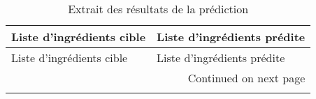 \begin{longtable}{p{7cm}p{7cm}}
\caption{Extrait des résultats de la prédiction}\label{tbl:GT_prediction_sample}\\ \hline
\toprule
                                                                                                                                                                                                                                                                              Liste d'ingrédients cible &                                                                                                                                                                                                                                                                                                                                                                                                                                             Liste d'ingrédients prédite \\ \hline
\midrule
\endfirsthead
\toprule
                                                                                                                                                                                                                                                                              Liste d'ingrédients cible &                                                                                                                                                                                                                                                                                                                                                                                                                                             Liste d'ingrédients prédite \\ \hline
\midrule

\endhead
\midrule
\multicolumn{2}{r}{{Continued on next page}} \\ \hline
\midrule
\endfoot


\end{longtable}
